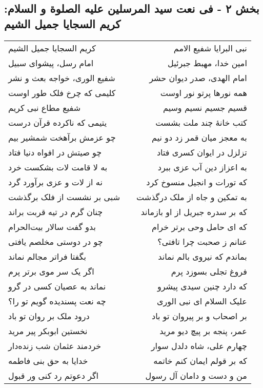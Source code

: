 \begin{center}
\section*{بخش ۲ - فی نعت سید المرسلین علیه الصلوة و السلام: کریم السجایا جمیل الشیم}
\label{sec:002}
\begin{longtable}{l p{0.5cm} r}
کریم السجایا جمیل الشیم
&&
نبی البرایا شفیع الامم
\\
امام رسل، پیشوای سبیل
&&
امین خدا، مهبط جبرئیل
\\
شفیع الوری، خواجه بعث و نشر
&&
امام الهدی، صدر دیوان حشر
\\
کلیمی که چرخ فلک طور اوست
&&
همه نورها پرتو نور اوست
\\
شفیع مطاع نبی کریم
&&
قسیم جسیم نسیم وسیم
\\
یتیمی که ناکرده قرآن درست
&&
کتب خانهٔ چند ملت بشست
\\
چو عزمش برآهخت شمشیر بیم
&&
به معجز میان قمر زد دو نیم
\\
چو صیتش در افواه دنیا فتاد
&&
تزلزل در ایوان کسری فتاد
\\
به لا قامت لات بشکست خرد
&&
به اعزاز دین آب عزی ببرد
\\
نه از لات و عزی برآورد گرد
&&
که تورات و انجیل منسوخ کرد
\\
شبی بر نشست از فلک برگذشت
&&
به تمکین و جاه از ملک درگذشت
\\
چنان گرم در تیه قربت براند
&&
که بر سدره جبریل از او بازماند
\\
بدو گفت سالار بیت‌الحرام
&&
که ای حامل وحی برتر خرام
\\
چو در دوستی مخلصم یافتی
&&
عنانم ز صحبت چرا تافتی؟
\\
بگفتا فراتر مجالم نماند
&&
بماندم که نیروی بالم نماند
\\
اگر یک سر موی برتر پرم
&&
فروغ تجلی بسوزد پرم
\\
نماند به عصیان کسی در گرو
&&
که دارد چنین سیدی پیشرو
\\
چه نعت پسندیده گویم تو را؟
&&
علیک السلام ای نبی الوری
\\
درود ملک بر روان تو باد
&&
بر اصحاب و بر پیروان تو باد
\\
نخستین ابوبکر پیر مرید
&&
عمر، پنجه بر پیچ دیو مرید
\\
خردمند عثمان شب زنده‌دار
&&
چهارم علی، شاه دلدل سوار
\\
خدایا به حق بنی فاطمه
&&
که بر قولم ایمان کنم خاتمه
\\
اگر دعوتم رد کنی ور قبول
&&
من و دست و دامان آل رسول

\end{longtable}
\end{center}
